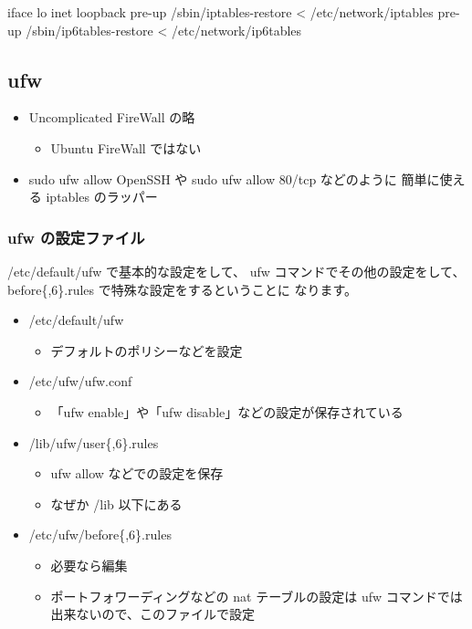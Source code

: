 \documentclass[mingoth,a4paper]{jsarticle}
\begin{document}
\begin{commandline}
iface lo inet loopback
 pre-up /sbin/iptables-restore < /etc/network/iptables
 pre-up /sbin/ip6tables-restore < /etc/network/ip6tables
\end{commandline}
\subsection{ufw}

\begin{itemize}
\item Uncomplicated FireWall の略

\begin{itemize}
\item Ubuntu FireWall ではない
\end{itemize}

\item sudo ufw allow OpenSSH や sudo ufw allow 80/tcp などのように
  簡単に使える iptables のラッパー
\end{itemize}
\subsubsection{ufw の設定ファイル}

/etc/default/ufw で基本的な設定をして、
ufw コマンドでその他の設定をして、
before\{,6\}.rules で特殊な設定をするということに
なります。

\begin{itemize}
\item /etc/default/ufw

\begin{itemize}
\item デフォルトのポリシーなどを設定
\end{itemize}

\item /etc/ufw/ufw.conf

\begin{itemize}
\item 「ufw enable」や「ufw disable」などの設定が保存されている
\end{itemize}

\item /lib/ufw/user\{,6\}.rules

\begin{itemize}
\item ufw allow などでの設定を保存
\item なぜか /lib 以下にある
\end{itemize}

\item /etc/ufw/before\{,6\}.rules

\begin{itemize}
\item 必要なら編集
\item ポートフォワーディングなどの nat テーブルの設定は
    ufw コマンドでは出来ないので、このファイルで設定
\end{itemize}

\end{itemize}
\end{document}
